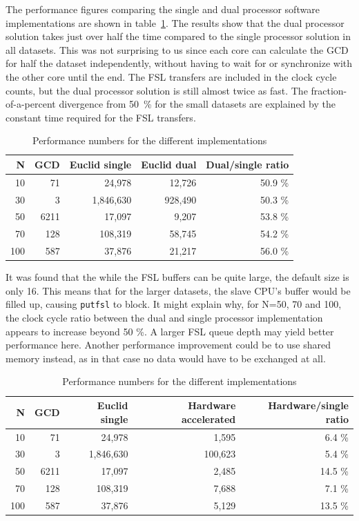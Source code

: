 \documentclass[11pt]{article}
\begin{document}
The performance figures comparing the single and dual processor software implementations are shown in table~\ref{tab:uni-dual}. The results show that the dual processor solution takes just over half the time compared to the single processor solution in all datasets. This was not surprising to us since each core can calculate the GCD for half the dataset independently, without having to wait for or synchronize with the other core until the end. The FSL transfers are included in the clock cycle counts, but the dual processor solution is still almost twice as fast. The fraction-of-a-percent divergence from 50~\% for the small datasets are explained by the constant time required for the FSL transfers.

\begin{table}
  \centering
   \begin{tabular}{rr|rrr}
     \toprule
     N & GCD & Euclid single & Euclid dual & Dual/single ratio \\
     \midrule
     10 & 71 & 24,978 & 12,726 & 50.9 \% \\
     30 & 3 & 1,846,630 & 928,490 & 50.3 \% \\
     50 & 6211 & 17,097 & 9,207 & 53.8 \% \\
     70 & 128 & 108,319 & 58,745 & 54.2 \% \\
     100 & 587 & 37,876 & 21,217 & 56.0 \% \\
     \bottomrule
   \end{tabular}
   \caption{Performance numbers for the different implementations}
   \label{tab:uni-dual}
\end{table}

It was found that the while the FSL buffers can be quite large, the default size is only 16\cite{fsl}. This means that for the larger datasets, the slave CPU's buffer would be filled up, causing \texttt{putfsl} to block. It might explain why, for N=50, 70 and 100, the clock cycle ratio between the dual and single processor implementation appears to increase beyond 50 \%. A larger FSL queue depth may yield better performance here. Another performance improvement could be to use shared memory instead, as in that case no data would have to be exchanged at all.

\begin{table}
  \centering
   \begin{tabular}{rr|rrr}
     \toprule
     N & GCD & Euclid single & Hardware accelerated & Hardware/single ratio \\
     \midrule
     10 & 71 & 24,978 & 1,595 & 6.4 \% \\
     30 & 3 & 1,846,630 & 100,623 & 5.4 \% \\
     50 & 6211 & 17,097 & 2,485 & 14.5 \% \\
     70 & 128 & 108,319 & 7,688 & 7.1 \% \\
     100 & 587 & 37,876 & 5,129 & 13.5 \% \\
     \bottomrule
   \end{tabular}
   \caption{Performance numbers for the different implementations}
   \label{tab:uni-hw}
\end{table}
\end{document}
